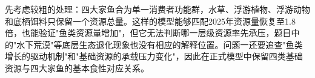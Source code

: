 先考虑较粗的处理：四大家鱼合为单一消费者功能群，水草、浮游植物、浮游动物和底栖饵料只保留一个资源总量。这样的模型能够匹配2025年资源量恢复至1.8倍，也能验证"鱼类资源量增加"，但它无法判断哪一层级资源率先承压，题目中的"水下荒漠"等底层生态退化现象也没有相应的解释位置。问题一还要追查"鱼类增长的驱动机制"和"基础资源的承载压力变化"，因此在正式模型中保留四类基础资源与四大家鱼的基本食性对应关系。
